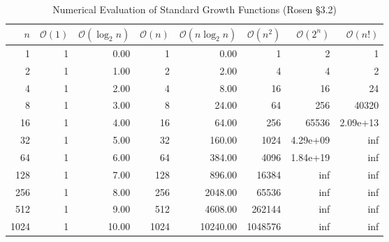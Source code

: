 \begin{table}[htbp]
\centering
\caption{Numerical Evaluation of Standard Growth Functions (Rosen §3.2)}
\label{tab:growth_functions}
\small
\begin{tabular*}{\textwidth}{@{\extracolsep{\fill}}rrrrrrrr}
\toprule
$n$ & $\mathcal{O}(1)$ & $\mathcal{O}(\log_2 n)$ & $\mathcal{O}(n)$ & $\mathcal{O}(n \log_2 n)$ & $\mathcal{O}(n^2)$ & $\mathcal{O}(2^n)$ & $\mathcal{O}(n!)$ \\
\midrule
1 & 1 & 0.00 & 1 & 0.00 & 1 & 2 & 1 \\
2 & 1 & 1.00 & 2 & 2.00 & 4 & 4 & 2 \\
4 & 1 & 2.00 & 4 & 8.00 & 16 & 16 & 24 \\
8 & 1 & 3.00 & 8 & 24.00 & 64 & 256 & 40320 \\
16 & 1 & 4.00 & 16 & 64.00 & 256 & 65536 & 2.09e+13 \\
32 & 1 & 5.00 & 32 & 160.00 & 1024 & 4.29e+09 & inf \\
64 & 1 & 6.00 & 64 & 384.00 & 4096 & 1.84e+19 & inf \\
128 & 1 & 7.00 & 128 & 896.00 & 16384 & inf & inf \\
256 & 1 & 8.00 & 256 & 2048.00 & 65536 & inf & inf \\
512 & 1 & 9.00 & 512 & 4608.00 & 262144 & inf & inf \\
1024 & 1 & 10.00 & 1024 & 10240.00 & 1048576 & inf & inf \\
\bottomrule
\end{tabular*}
\end{table}
